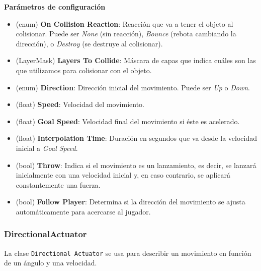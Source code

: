 \textbf{Parámetros de configuración}
\begin{itemize}
	\item (enum) \textbf{On Collision Reaction}: Reacción que va a tener el objeto al colisionar. Puede ser \textit{None} (sin reacción), \textit{Bounce} (rebota cambiando la dirección), o \textit{Destroy} (se destruye al colisionar).
	\item (LayerMask) \textbf{Layers To Collide}: Máscara de capas que indica cuáles son las que utilizamos para colisionar con el objeto.
	\item (enum) \textbf{Direction}: Dirección inicial del movimiento. Puede ser \textit{Up} o \textit{Down}.
	\item (float) \textbf{Speed}: Velocidad del movimiento.
	\item (float) \textbf{Goal Speed}: Velocidad final del movimiento si éste es acelerado.
	\item (float) \textbf{Interpolation Time}: Duración en segundos que va desde la velocidad inicial a \textit{Goal Speed}.
	\item (bool) \textbf{Throw}: Indica si el movimiento es un lanzamiento, es decir, se lanzará inicialmente con una velocidad inicial y, en caso contrario, se aplicará constantemente una fuerza.
	\item (bool) \textbf{Follow Player}: Determina si la dirección del movimiento se ajusta automáticamente para acercarse al jugador.
\end{itemize}

\subsubsection{DirectionalActuator}
La clase \texttt{Directional Actuator} se usa para describir un movimiento en función de un ángulo y una velocidad.\\

